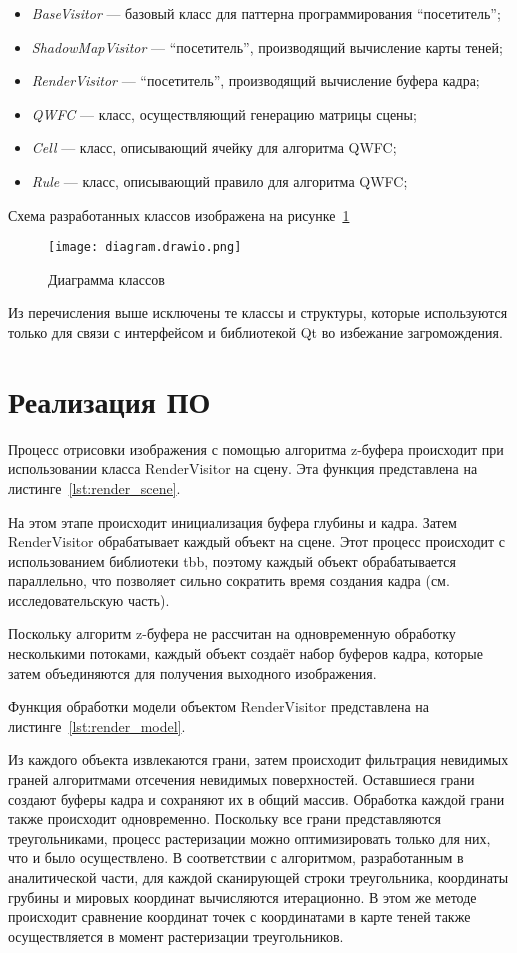 \begin{itemize}
  \item \emph{BaseVisitor} --- базовый класс для паттерна программирования ``посетитель'';
  \item \emph{ShadowMapVisitor} --- ``посетитель'', производящий вычисление карты теней;
  \item \emph{RenderVisitor} --- ``посетитель'', производящий вычисление буфера кадра;
  \item \emph{QWFC} --- класс, осуществляющий генерацию матрицы сцены;
  \item \emph{Cell} --- класс, описывающий ячейку для алгоритма QWFC;
  \item \emph{Rule} --- класс, описывающий правило для алгоритма QWFC;
\end{itemize}

Схема разработанных классов изображена на рисунке~\ref{fig:UML}

\begin{figure}[h!]
  \texttt{[image: diagram.drawio.png]}
  \caption{Диаграмма классов}
  \label{fig:UML}
\end{figure}

Из перечисления выше исключены те классы и структуры, которые используются только для связи с интерфейсом и библиотекой Qt во избежание загромождения.

\section{Реализация ПО}

Процесс отрисовки изображения с помощью алгоритма z-буфера происходит при использовании класса RenderVisitor на сцену. 
Эта функция представлена на листинге~\ref{lst:render_scene}. 

На этом этапе происходит инициализация буфера глубины и кадра. Затем RenderVisitor обрабатывает каждый объект на сцене. Этот процесс происходит с использованием библиотеки tbb, поэтому каждый объект обрабатывается параллельно, что позволяет сильно сократить время создания кадра (см. исследовательскую часть).

Поскольку алгоритм z-буфера не рассчитан на одновременную обработку несколькими потоками, каждый объект создаёт набор буферов кадра, которые затем объединяются для получения выходного изображения.

Функция обработки модели объектом RenderVisitor представлена на листинге~\ref{lst:render_model}.

Из каждого объекта извлекаются грани, затем происходит фильтрация невидимых граней алгоритмами отсечения невидимых поверхностей. Оставшиеся грани создают буферы кадра и сохраняют их в общий массив. Обработка каждой грани также происходит одновременно. Поскольку все грани представляются треугольниками, процесс растеризации можно оптимизировать только для них, что и было осуществлено. 
В соответствии с алгоритмом, разработанным в аналитической части, для каждой сканирующей строки треугольника, координаты грубины и мировых координат вычисляются итерационно.
В этом же методе происходит сравнение координат точек с координатами в карте теней также осуществляется в момент растеризации треугольников.

